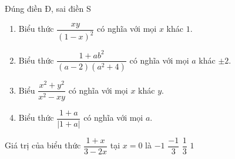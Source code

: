 \begin{ex}%
	Đúng điền Đ, sai điền S
	\begin{enumerate}
		\item Biểu thức $\dfrac{xy}{(1-x)^2}$ có nghĩa với mọi $x$ khác $1$.
		\item Biểu thức $\dfrac{1+ab^2}{(a-2)(a^2+4)}$ có nghĩa với mọi $a$ khác $\pm 2$.
		\item Biểu $\dfrac{x^2+y^2}{x^2-xy}$ có nghĩa với mọi $x$ khác $y$.
		\item Biểu thức $\dfrac{1+a}{\left| 1+a \right| }$ có nghĩa với mọi $a$.
	\end{enumerate}
\end{ex}
\begin{ex}%
	Giá trị của biểu thức $\dfrac{1+x}{3-2x}$ tại $x=0$ là
	\choice
	{$-1$}
	{$\dfrac{-1}{3}$}
	{\True $\dfrac{1}{3}$}
	{$1$}	
\end{ex}

